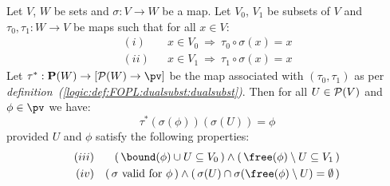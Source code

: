 \begin{lemma}\label{logic:lemma:FOPL:localinv:lem}
Let $V$, $W$ be sets and $\sigma:V\to W$ be a map. Let $V_{0}$,
$V_{1}$ be subsets of $V$ and $\tau_{0},\tau_{1}:W\to V$ be maps
such that for all $x\in V$:
   \begin{eqnarray*}
    (i)&&x\in V_{0}\ \Rightarrow\ \tau_{0}\circ\sigma(x)=x\\
    (ii)&&x\in V_{1}\ \Rightarrow\ \tau_{1}\circ\sigma(x)=x
    \end{eqnarray*}
Let $\tau^{*}:{\bf P}(W)\to[{\cal P}(W)\to\pv]$ be the map
associated with $(\tau_{0},\tau_{1})$ as per {\em
definition~(\ref{logic:def:FOPL:dualsubst:dualsubst})}. Then for all
$U\in{\cal P}(V)$ and $\phi\in\pv$ we have:
    \begin{equation}\label{logic:eqn:FOPL:localinv:lemma:1}
    \tau^{*}(\sigma(\phi))(\sigma(U))=\phi
    \end{equation}
provided $U$ and $\phi$ satisfy the following properties:
    \begin{eqnarray*}
    (iii)&&
    (\,\bound(\phi)\cup U\subseteq V_{0}\,)
    \land(\,\free(\phi)\setminus U\subseteq V_{1}\,)\\
    (iv)&&(\,\mbox{$\sigma$ valid for $\phi$}\,)\land
    (\,\sigma(U)\cap\sigma(\free(\phi)\setminus U)=\emptyset\,)\\
    \end{eqnarray*}
\end{lemma}
